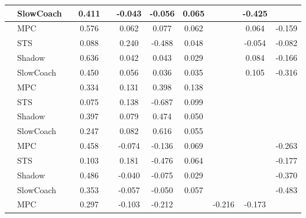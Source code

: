 \begin{tabular}{|l|l|*{9}{c|}}
                                                           & SlowCoach &       &     0.411 &        & -0.043 & -0.056 &  0.065 &      &  -0.425 &       \\
\midrule
[False, True, False, True, True, True, False, True, True] & MPC &       &     0.576 &        &  0.062 &  0.077 &  0.062 &      &   0.064 &   -0.159 \\
                                                           & STS &       &     0.088 &        &  0.240 & -0.488 &  0.048 &      &  -0.054 &   -0.082 \\
                                                           & Shadow &       &     0.636 &        &  0.042 &  0.043 &  0.029 &      &   0.084 &   -0.166 \\
                                                           & SlowCoach &       &     0.450 &        &  0.056 &  0.036 &  0.035 &      &   0.105 &   -0.316 \\
\midrule
[False, True, False, True, True, True, False, False, False] & MPC &       &     0.334 &        &  0.131 &  0.398 &  0.138 &      &      &       \\
                                                           & STS &       &     0.075 &        &  0.138 & -0.687 &  0.099 &      &      &       \\
                                                           & Shadow &       &     0.397 &        &  0.079 &  0.474 &  0.050 &      &      &       \\
                                                           & SlowCoach &       &     0.247 &        &  0.082 &  0.616 &  0.055 &      &      &       \\
\midrule
[False, True, False, True, True, True, False, False, True] & MPC &       &     0.458 &        & -0.074 & -0.136 &  0.069 &      &      &   -0.263 \\
                                                           & STS &       &     0.103 &        &  0.181 & -0.476 &  0.064 &      &      &   -0.177 \\
                                                           & Shadow &       &     0.486 &        & -0.040 & -0.075 &  0.029 &      &      &   -0.370 \\
                                                           & SlowCoach &       &     0.353 &        & -0.057 & -0.050 &  0.057 &      &      &   -0.483 \\
\midrule
[False, True, False, True, True, False, True, True, False] & MPC &       &     0.297 &        & -0.103 & -0.212 &     &  -0.216 &  -0.173 &       \\

\end{tabular}
